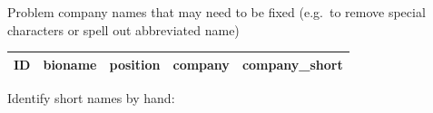 \documentclass[]{article}
\newenvironment{Shaded}{\begin{snugshade}}{\end{snugshade}}
\newcommand{\KeywordTok}[1]{\textcolor[rgb]{0.13,0.29,0.53}{\textbf{#1}}}
\newcommand{\DecValTok}[1]{\textcolor[rgb]{0.00,0.00,0.81}{#1}}
\newcommand{\StringTok}[1]{\textcolor[rgb]{0.31,0.60,0.02}{#1}}
\newcommand{\CommentTok}[1]{\textcolor[rgb]{0.56,0.35,0.01}{\textit{#1}}}
\newcommand{\OperatorTok}[1]{\textcolor[rgb]{0.81,0.36,0.00}{\textbf{#1}}}
\newcommand{\NormalTok}[1]{#1}
\begin{document}
\begin{Shaded}
\begin{Highlighting}[]
{{{{{{{{{{{{\NormalTok{dcorps}\OperatorTok{$}\NormalTok{company_short <-}\StringTok{ }\KeywordTok{trim}\NormalTok{(dcorps}\OperatorTok{$}\NormalTok{company) }\OperatorTok{%
\end{Highlighting}
\end{Shaded}

Problem company names that may need to be fixed (e.g.~to remove special
characters or spell out abbreviated name)

\begin{Shaded}
\end{Shaded}

\begin{longtable}[]{@{}lllll@{}}
\toprule
ID & bioname & position & company & company\_short\tabularnewline
\midrule
\endhead
\bottomrule
\end{longtable}

\begin{Shaded}
\end{Shaded}

Identify short names by hand:
\end{document}
